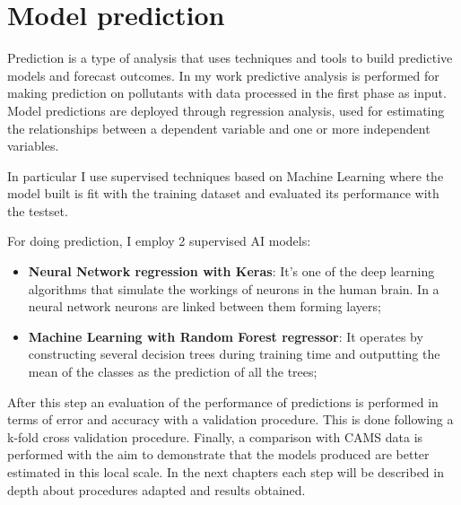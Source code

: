 \section{Model prediction}
Prediction is a type of analysis that uses techniques and tools to build predictive models and forecast outcomes. In my work predictive analysis is performed for making prediction on pollutants with data processed in the first phase as input.\newline
Model predictions are deployed through regression analysis, used for estimating the relationships between a dependent variable and one or more independent variables.\par
In particular I use supervised techniques based on Machine Learning where the model built is fit with the training dataset and evaluated its performance with the testset. 

For doing prediction, I employ 2 supervised AI models:
\begin{itemize}
\item \textbf{Neural Network regression with Keras}: It's one of the deep learning algorithms that simulate the workings of neurons in the human brain. In a neural network neurons are linked between them forming layers; 
\item \textbf{Machine Learning with Random Forest regressor}: It operates by constructing several decision trees during training time and outputting the mean of the classes as the prediction of all the trees;
\end{itemize}
After this step an evaluation of the performance of predictions is performed in terms of error and accuracy with a validation procedure.\newline
This is done following  a k-fold cross validation procedure.
Finally, a comparison with CAMS data is performed with the aim to demonstrate that the models produced are better estimated in this local scale.
In the next chapters each step will be described in depth about procedures adapted and results obtained.

